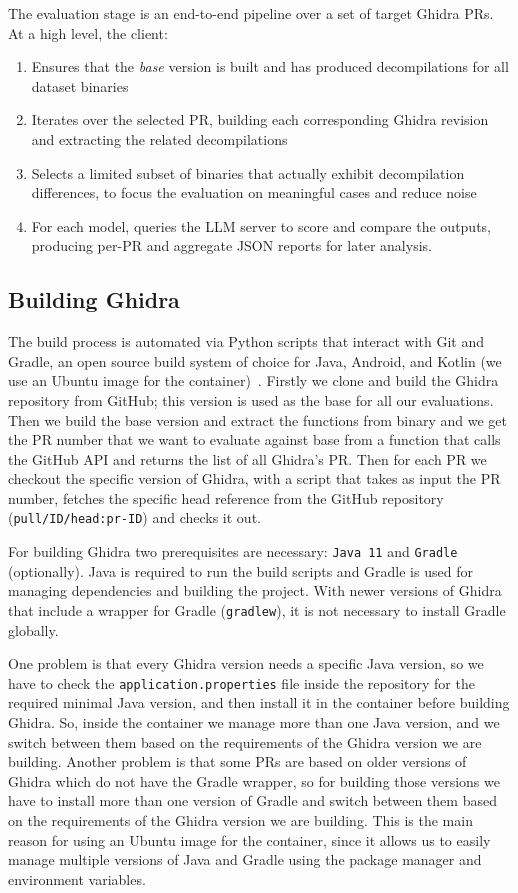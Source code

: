 The evaluation stage is an end-to-end pipeline over a set of target Ghidra \acp{PR}. At a high level, the client:
\begin{enumerate}
    \item Ensures that the \emph{base} version is built and has produced decompilations for all dataset binaries
    \item Iterates over the selected \ac{PR}, building each corresponding Ghidra revision and extracting the related decompilations
    \item Selects a limited subset of binaries that actually exhibit decompilation differences, to focus the evaluation on meaningful cases and reduce noise
    \item For each model, queries the \ac{LLM} server to score and compare the outputs, producing per-\ac{PR} and aggregate \ac{JSON} reports for later analysis.
\end{enumerate}

\subsection{Building Ghidra}
The build process is automated via Python scripts that interact with Git and Gradle, an open source build system of choice for Java, Android, and Kotlin (we use an Ubuntu image for the container)~\cite{site:gradleGradleBuild}.
Firstly we clone and build the Ghidra repository from GitHub; this version is used as the base for all our evaluations.
Then we build the base version and extract the functions from binary and we get the \ac{PR} number that we want to evaluate against base from a function that calls the GitHub \ac{API} and returns the list of all Ghidra's \ac{PR}.
Then for each \ac{PR} we checkout the specific version of Ghidra, with a script that takes as input the \ac{PR} number, fetches the specific head reference from the GitHub repository (\texttt{pull/ID/head:pr-ID}) and checks it out.

For building Ghidra two prerequisites are necessary: \texttt{Java 11} and \texttt{Gradle} (optionally). Java is required to run the build scripts and Gradle is used for managing dependencies and building the project. 
With newer versions of Ghidra that include a wrapper for Gradle (\texttt{gradlew}), it is not necessary to install Gradle globally.

One problem is that every Ghidra version needs a specific Java version, so we have to check the \texttt{application.properties} file inside the repository for the required minimal Java version, and then install it in the container before building Ghidra.
So, inside the container we manage more than one Java version, and we switch between them based on the requirements of the Ghidra version we are building.
Another problem is that some \ac{PR}s are based on older versions of Ghidra which do not have the Gradle wrapper, so for building those versions we have to install more than one version of Gradle and switch between them based on the requirements of the Ghidra version we are building.
This is the main reason for using an Ubuntu image for the container, since it allows us to easily manage multiple versions of Java and Gradle using the package manager and environment variables.

